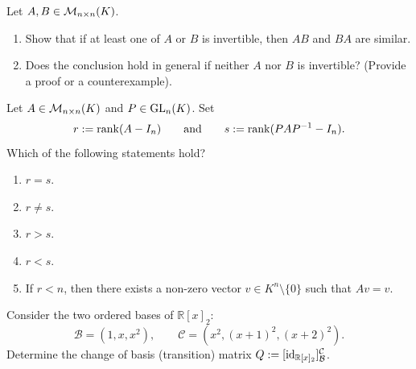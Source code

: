 \begin{exercise}
\label{exc:similarity_of_matrix_products}
Let $A, B \in \mathcal{M}_{n \times n}(K)$.
\begin{enumerate}
    \item Show that if at least one of $A$ or $B$ is invertible, then $AB$ and $BA$ are similar.
    \item Does the conclusion hold in general if neither $A$ nor $B$ is invertible? (Provide a proof or a counterexample).
\end{enumerate}
\end{exercise}

\begin{exercise}
\label{exc:rank_invariance_similarity_mc}
Let $A \in \mathcal{M}_{n \times n}(K)$ and $P \in \operatorname{GL}_n(K)$. Set
\[
r := \operatorname{rank}(A - I_n) \qquad \text{and} \qquad s := \operatorname{rank}(P A P^{-1} - I_n).
\]
Which of the following statements hold?
\begin{enumerate}[label=\textbf{(\alph*)}]
    \item $r = s$.
    \item $r \ne s$.
    \item $r > s$.
    \item $r < s$.
    \item If $r < n$, then there exists a non-zero vector $v \in K^n \setminus \{0\}$ such that $Av = v$.
\end{enumerate}
\end{exercise}

\begin{exercise}
\label{exc:change_of_basis_polynomials_mc}
Consider the two ordered bases of $\mathbb{R}[x]_2$:
\[
\mathcal{B} = (1, x, x^2), \qquad \mathcal{C} = \left( x^2, (x+1)^2, (x+2)^2 \right).
\]
Determine the change of basis (transition) matrix $Q := [\operatorname{id}_{\mathbb{R}[x]_2}]_{\mathcal{B}}^{\mathcal{C}}$.
\end{exercise}

